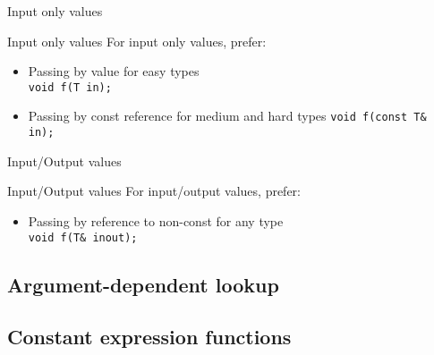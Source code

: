 \begin{frame}{Input only values}{}
  \begin{block}{Input only values}
    For input only values, prefer:
    \begin{itemize}
    \item
      Passing by value for easy types \\
      \lstinline!void f(T in);!
    \item
      Passing by const reference for medium and hard types
      \lstinline!void f(const T& in);!
    \end{itemize}
  \end{block}

  \begin{example}
  \end{example}
\end{frame}

\begin{frame}{Input/Output values}{}
  \begin{block}{Input/Output values}
    For input/output values, prefer:
    \begin{itemize}
    \item
      Passing by reference to non-const for any type \\
      \lstinline!void f(T& inout);!
    \end{itemize}
  \end{block}

  \begin{example}
  \end{example}
\end{frame}



\subsection{Argument-dependent lookup}


\subsection{Constant expression functions}






